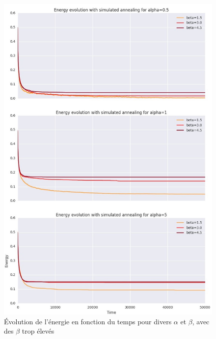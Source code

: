 \documentclass[twocolumn]{article}
\begin{document}
\begin{figure}[!h]
	\includegraphics[width=\columnwidth]{../tobekept/skype_2.jpg}
	\caption{Évolution de l'énergie en fonction du temps pour divers $\alpha$ et $\beta$, avec des $\beta$ trop élevés}
\end{figure}
\end{document}
